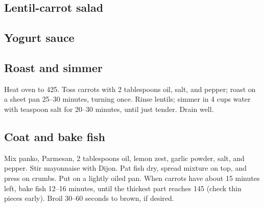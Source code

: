 \begin{recipe}
\subsection{Lentil-carrot salad}

\subsection{Yogurt sauce}

\subsection{Roast and simmer}
Heat oven to 425\degree{}. Toss carrots with 2 tablespoons oil, salt, and pepper; roast on a sheet pan 25--30 minutes, turning once. Rinse lentils; simmer in 4 cups water with  teaspoon salt for 20--30 minutes, until just tender. Drain well.

\subsection{Coat and bake fish}
Mix panko, Parmesan, 2 tablespoons oil, lemon zest, garlic powder, salt, and pepper. Stir mayonnaise with Dijon. Pat fish dry, spread mixture on top, and press on crumbs. Put on a lightly oiled pan. When carrots have about 15 minutes left, bake fish 12--16 minutes, until the thickest part reaches 145\degree{} (check thin pieces early). Broil 30--60 seconds to brown, if desired.


\end{recipe}

